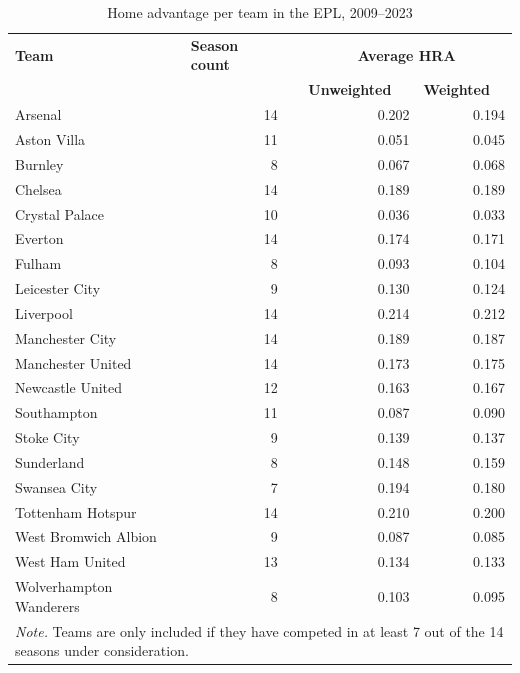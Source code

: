 \begin{table}[htbp]
    \begin{spacing}{1.5}
    \small
    \centering
    \caption{Home advantage per team in the EPL, 2009--2023}
    \label{tab:hra_per_team}%
    \begin{tabular}{lrrrr}
        \toprule
        \toprule
        \textbf{Team}  & \multicolumn{1}{l}{\textbf{Season count}} &       & \multicolumn{2}{c}{\textbf{Average HRA}} \\
        \cmidrule{4-5}          &       &       & \multicolumn{1}{l}{\textbf{Unweighted}} & \multicolumn{1}{l}{\textbf{Weighted}} \\
        \midrule
        Arsenal & 14    &       & 0.202 & 0.194 \\
        Aston Villa & 11    &       & 0.051 & 0.045 \\
        Burnley & 8     &       & 0.067 & 0.068 \\
        Chelsea & 14    &       & 0.189 & 0.189 \\
        Crystal Palace & 10    &       & 0.036 & 0.033 \\
        Everton & 14    &       & 0.174 & 0.171 \\
        Fulham & 8     &       & 0.093 & 0.104 \\
        Leicester City & 9     &       & 0.130 & 0.124 \\
        Liverpool & 14    &       & 0.214 & 0.212 \\
        Manchester City & 14    &       & 0.189 & 0.187 \\
        Manchester United & 14    &       & 0.173 & 0.175 \\
        Newcastle United & 12    &       & 0.163 & 0.167 \\
        Southampton & 11    &       & 0.087 & 0.090 \\
        Stoke City & 9     &       & 0.139 & 0.137 \\
        Sunderland & 8     &       & 0.148 & 0.159 \\
        Swansea City & 7     &       & 0.194 & 0.180 \\
        Tottenham Hotspur & 14    &       & 0.210 & 0.200 \\
        West Bromwich Albion & 9     &       & 0.087 & 0.085 \\
        West Ham United & 13    &       & 0.134 & 0.133 \\
        Wolverhampton Wanderers & 8     &       & 0.103 & 0.095 \\
        \bottomrule
        \bottomrule
        \multicolumn{5}{p{12cm}}{\footnotesize\textit{Note.} Teams are only included if they have competed in at least 7 out of the 14 seasons under consideration.}
    \end{tabular}
    \end{spacing}
\end{table}%

